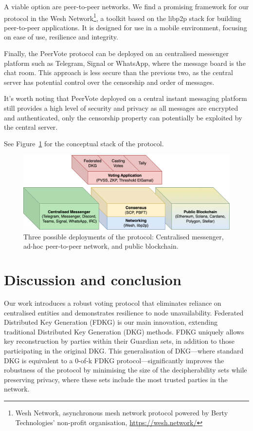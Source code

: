 \documentclass[runningheads]{llncs}
\begin{document}
A viable option are peer-to-peer networks. 
We find a promising framework for our protocol in the Wesh Network\footnote{Wesh Network, asynchronous mesh network protocol powered by Berty Technologies' non-profit organisation, \url{https://wesh.network/}}, a toolkit based on the libp2p stack for building peer-to-peer applications.
It is designed for use in a mobile environment, focusing on ease of use, resilience and integrity.

Finally, the PeerVote protocol can be deployed on an centralised messenger platform such as Telegram, Signal or WhatsApp, where the message board is the chat room. This approach is less secure than the previous two, as the central server has potential control over the censorship and order of messages. 

It's worth noting that PeerVote deployed on a central instant messaging platform still provides a high level of security and privacy as all messages are encrypted and authenticated, only the censorship property can potentially be exploited by the central server.

See Figure~\ref{fig:stack-bc} for the conceptual stack of the protocol.

\begin{figure}
    \centering
    \includegraphics[width=\textwidth]{stack-bc.png}
    \caption{Three possible deployments of the protocol: Centralised messenger, ad-hoc peer-to-peer network, and public blockchain.}
    \label{fig:stack-bc}
\end{figure}

\section{Discussion and conclusion}

Our work introduces a robust voting protocol that eliminates reliance on centralised entities and demonstrates resilience to node unavailability. Federated Distributed Key Generation (FDKG) is our main innovation, extending traditional Distributed Key Generation (DKG) methods. FDKG uniquely allows key reconstruction by parties within their Guardian sets, in addition to those participating in the original DKG. This generalisation of DKG—where standard DKG is equivalent to a 0-of-k FDKG protocol—significantly improves the robustness of the protocol by minimising the size of the decipherability sets while preserving privacy, where these sets include the most trusted parties in the network.
\end{document}
